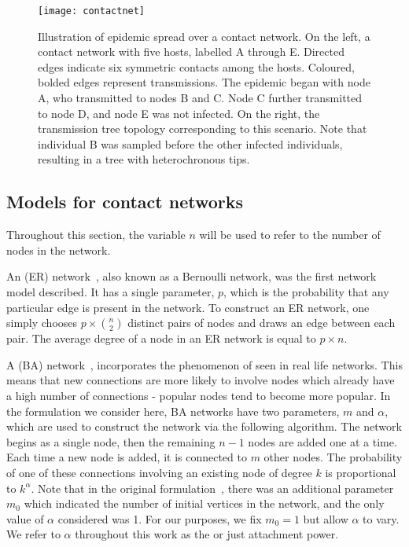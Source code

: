 \begin{figure}[ht]
  \centering
  \label{fig:contactnet}
  \texttt{[image: contactnet]}
  \caption[Illustration of a epidemic spread over a contact network]
  {Illustration of epidemic spread over a contact network. On the left, a
   contact network with five hosts, labelled A through E. Directed edges
   indicate six symmetric contacts among the hosts. Coloured, bolded edges
   represent transmissions. The epidemic began with node A, who transmitted to
   nodes B and C. Node C further transmitted to node D, and node E was not
   infected. On the right, the transmission tree topology corresponding to this
   scenario. Note that individual B was sampled before the other infected
   individuals, resulting in a tree with heterochronous tips.}
\end{figure}

\subsection{Models for contact networks}
\label{subsubsec:generative}

Throughout this section, the variable $n$ will be used to refer to the number
of nodes in the network. 

An  (ER) network~\autocite{erdos1960evolution}, also
known as a Bernoulli network, was the first network model described. It has a
single parameter, $p$, which is the probability that any particular edge is
present in the network. To construct an ER network, one simply chooses
$p \times \binom{n}{2}$ distinct pairs of nodes and draws an edge between each
pair. The average degree of a node in an ER network is equal to $p \times n$.

A  (BA) network~\autocite{barabasi1999emergence},
incorporates the phenomenon of  seen in real life
networks. This means that new connections are more likely to involve nodes
which already have a high number of connections - popular nodes tend to become
more popular. In the formulation we consider here, BA networks have two
parameters, $m$ and $\alpha$, which are used to construct the network via the
following algorithm. The network begins as a single node, then the remaining
$n-1$ nodes are added one at a time. Each time a new node is added, it is
connected to $m$ other nodes. The probability of one of these connections
involving an existing node of degree $k$ is proportional to $k^\alpha$. Note
that in the original formulation~\autocite{barabasi1999emergence}, there was an
additional parameter $m_0$ which indicated the number of initial vertices in
the network, and the only value of $\alpha$ considered was 1. For our purposes,
we fix $m_0 = 1$ but allow $\alpha$ to vary. We refer to $\alpha$ throughout
this work as the  or just attachment power.

